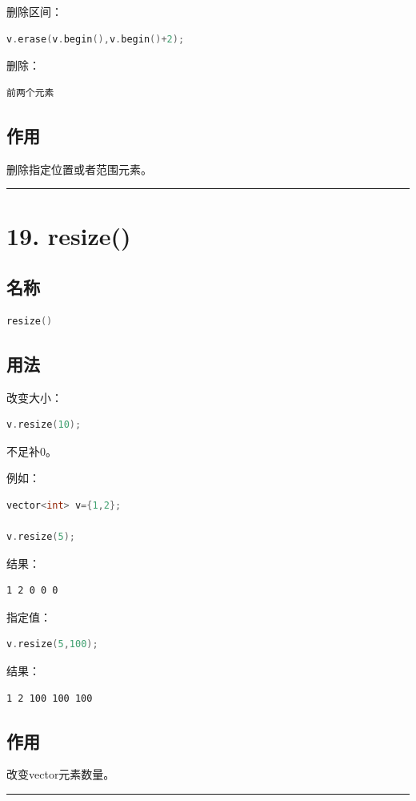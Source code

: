 \documentclass[10pt,twocolumn]{extarticle}
\begin{document}
删除区间：
\begin{lstlisting}[language=C++]
v.erase(v.begin(),v.begin()+2);
\end{lstlisting}
删除：
\begin{lstlisting}
前两个元素
\end{lstlisting}

\subsection{作用}
删除指定位置或者范围元素。

\noindent\rule{\linewidth}{0.4pt}

\section{19. resize()}

\subsection{名称}
\begin{lstlisting}[language=C++]
resize()
\end{lstlisting}

\subsection{用法}
改变大小：
\begin{lstlisting}[language=C++]
v.resize(10);
\end{lstlisting}
不足补0。

例如：
\begin{lstlisting}[language=C++]
vector<int> v={1,2};

v.resize(5);
\end{lstlisting}
结果：
\begin{lstlisting}
1 2 0 0 0
\end{lstlisting}

指定值：
\begin{lstlisting}[language=C++]
v.resize(5,100);
\end{lstlisting}
结果：
\begin{lstlisting}
1 2 100 100 100
\end{lstlisting}

\subsection{作用}
改变vector元素数量。

\noindent\rule{\linewidth}{0.4pt}
\end{document}

